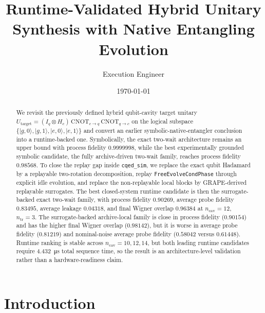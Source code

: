\documentclass[aps,pra,twocolumn,reprint,amsmath,amssymb]{revtex4-2}
\begin{document}
\title{Runtime-Validated Hybrid Unitary Synthesis with Native Entangling Evolution}
\author{Execution Engineer}
\date{\today}

\begin{abstract}
We revisit the previously defined hybrid qubit-cavity target unitary
$U_{\mathrm{target}} = (I_q \otimes H_c)\,\mathrm{CNOT}_{c \rightarrow q}\,\mathrm{CNOT}_{q \rightarrow c}$
on the logical subspace $\{\lvert g,0 \rangle, \lvert g,1 \rangle, \lvert e,0 \rangle, \lvert e,1 \rangle\}$
and convert an earlier symbolic-native-entangler conclusion into a runtime-backed
one. Symbolically, the exact two-wait architecture remains an upper bound with
process fidelity $0.9999998$, while the best experimentally grounded symbolic
candidate, the fully archive-driven two-wait family, reaches process fidelity
$0.98568$. To close the replay gap inside \texttt{cqed\_sim}, we replace the
exact qubit Hadamard by a replayable two-rotation decomposition, replay
\texttt{FreeEvolveCondPhase} through explicit idle evolution, and replace the
non-replayable local blocks by GRAPE-derived replayable surrogates. The best
closed-system runtime candidate is then the surrogate-backed exact two-wait
family, with process fidelity $0.90269$, average probe fidelity $0.83495$,
average leakage $0.04318$, and final Wigner overlap $0.96384$ at
$n_{\mathrm{cav}} = 12$, $n_{\mathrm{tr}} = 3$. The surrogate-backed archive-local
family is close in process fidelity ($0.90154$) and has the higher final Wigner
overlap ($0.98142$), but it is worse in average probe fidelity ($0.81219$) and
nominal-noise average probe fidelity ($0.58042$ versus $0.61448$). Runtime
ranking is stable across $n_{\mathrm{cav}} = 10, 12, 14$, but both leading
runtime candidates require \SI{4.432}{\micro\second} total sequence time, so the
result is an architecture-level validation rather than a hardware-readiness
claim.
\end{abstract}

\maketitle

\section{Introduction}
\end{document}
